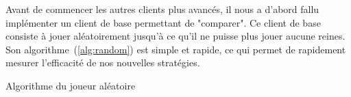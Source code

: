 Avant de commencer les autres clients plus avancés, il nous a d'abord
fallu implémenter un client de base permettant de "comparer". Ce client de base
consiste à jouer aléatoirement jusqu'à ce qu'il ne puisse plus jouer aucune reines.
Son algorithme~(\ref{alg:random}) est simple et rapide, ce qui permet de rapidement
mesurer l'efficacité de nos nouvelles stratégies.

\begin{algorithm}[H]
	\caption{Algorithme du joueur aléatoire}
	\label{alg:random}
\end{algorithm}